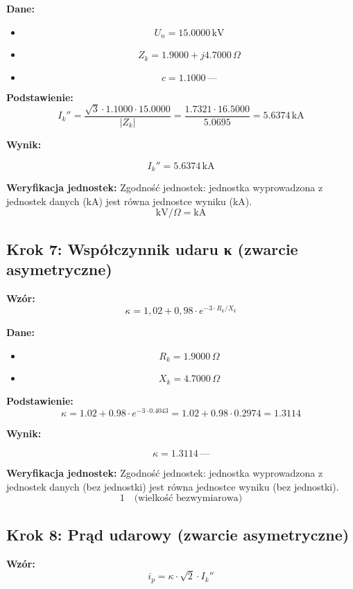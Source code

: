 \documentclass[11pt,a4paper]{article}
\begin{document}
\textbf{Dane:}
\begin{itemize}
  \item
$$
U_n = 15.0000\,\mathrm{kV}
$$
  \item
$$
Z_k = 1.9000 + j4.7000\,\Omega
$$
  \item
$$
c = 1.1000\,\text{—}
$$
\end{itemize}

\textbf{Podstawienie:}
$$
I_k'' = \frac{\sqrt{3} \cdot 1.1000 \cdot 15.0000}{|Z_k|} = \frac{1.7321 \cdot 16.5000}{5.0695} = 5.6374\,\text{kA}
$$

\textbf{Wynik:}
\begin{center}
$$
I_k'' = 5.6374\,\mathrm{kA}
$$
\end{center}

\textbf{Weryfikacja jednostek:} Zgodność jednostek: jednostka wyprowadzona z jednostek danych (kA) jest równa jednostce wyniku (kA).
$$
\mathrm{kV}/\Omega = \mathrm{kA}
$$

\subsection{Krok 7: Współczynnik udaru κ (zwarcie asymetryczne)}

\textbf{Wzór:}
$$
\kappa = 1{,}02 + 0{,}98 \cdot e^{-3 \cdot R_k / X_k}
$$

\textbf{Dane:}
\begin{itemize}
  \item
$$
R_k = 1.9000\,\Omega
$$
  \item
$$
X_k = 4.7000\,\Omega
$$
\end{itemize}

\textbf{Podstawienie:}
$$
\kappa = 1.02 + 0.98 \cdot e^{-3 \cdot 0.4043} = 1.02 + 0.98 \cdot 0.2974 = 1.3114
$$

\textbf{Wynik:}
\begin{center}
$$
\kappa = 1.3114\,\text{—}
$$
\end{center}

\textbf{Weryfikacja jednostek:} Zgodność jednostek: jednostka wyprowadzona z jednostek danych (bez jednostki) jest równa jednostce wyniku (bez jednostki).
$$
1 \quad \text{(wielkość bezwymiarowa)}
$$

\subsection{Krok 8: Prąd udarowy (zwarcie asymetryczne)}

\textbf{Wzór:}
$$
i_p = \kappa \cdot \sqrt{2} \cdot I_k''
$$
\end{document}

